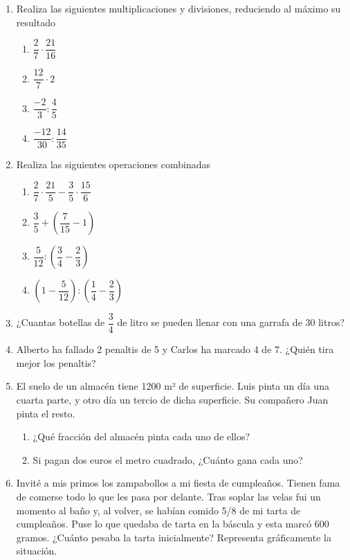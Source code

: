\documentclass[a4paper,12pt]{article}
\begin{document}
\begin{enumerate}
\begin{enumerate}
                \item $\dfrac{3}{10}+\dfrac{2}{10}$
                \item $\dfrac{5}{8} + \dfrac{7}{8}$
                \item $\dfrac{3}{10}-\dfrac{2}{5}+\dfrac{3}{2}$
                \item $\dfrac{4}{5}+\dfrac{2}{7}-1$
            \end{enumerate}
        \item Realiza las siguientes multiplicaciones y divisiones, reduciendo al máximo su resultado
            \begin{enumerate}
                \item $\dfrac{2}{7} \cdot \dfrac{21}{16}$
                \item $\dfrac{12}{7} \cdot   2$
                \item $\dfrac{-2}{3} : \dfrac{4}{5}$
                \item $\dfrac{-12}{30}: \dfrac{14}{35}$
            \end{enumerate}
        \item Realiza las siguientes operaciones combinadas
            \begin{enumerate}
                \item $\dfrac{2}{7} \cdot \dfrac{21}{5} - \dfrac{3}{5} \cdot   \dfrac{15}{6}$
                \item $\dfrac{3}{5}+ (\dfrac{7}{15}-1)$
                \item $\dfrac{5}{12}: (\dfrac{3}{4}- \dfrac{2}{3})$
                \item $(1- \dfrac{5}{12}): (\dfrac{1}{4} - \dfrac{2}{3})$
            \end{enumerate}
        \item ¿Cuantas botellas de $\dfrac{3}{4}$ de litro se pueden llenar con una garrafa de 30 litros?
        \item Alberto ha fallado 2 penaltis de 5 y Carlos ha marcado 4 de 7. ¿Quién tira mejor los penaltis?
        \item El suelo de un almacén tiene 1200 m² de superficie. Luis pinta un día una cuarta parte, y otro día un tercio de dicha superficie. Su compañero Juan pinta el resto.
        \begin{enumerate}
            \item ¿Qué fracción del almacén pinta cada uno de ellos?
            \item Si pagan dos euros el metro cuadrado, ¿Cuánto gana cada uno?
        \end{enumerate}
        \item Invité a mis primos los zampabollos a mi fiesta de cumpleaños. Tienen fama de comerse todo lo que les pasa por delante. Tras soplar las velas fui un momento al baño y, al volver, se habían comido 5/8 de mi tarta de cumpleaños. Puse lo que quedaba de tarta en la báscula y esta marcó 600 gramos. ¿Cuánto pesaba la tarta inicialmente? Representa gráficamente la situación.
    \end{enumerate}
\end{document}
